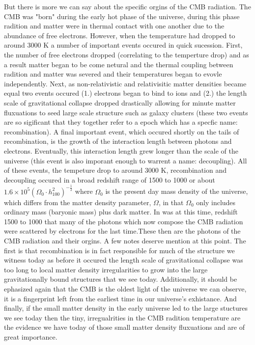 \documentclass[12pt]{article} %
\begin{document}
But there is more we can say about the specific orgins of the CMB radiation. The CMB was "born" during the early hot phase of the universe, during this phase radition and matter were in thermal contact with one another due to the abundance of free electrons. However, when the temperature had dropped to around 3000 K a number of important events occured in quick sucession. First, the number of free electrons dropped (correlating to the temperture drop) and as a result matter began to be come netural and the thermal coupling between radition and matter was severed and their temperatures began to evovle independently. Next, as non-relativistic and relativisitic matter densities became equal two events occured (1.) electrons began to bind to ions and (2.) the length scale of gravitational collapse dropped drastically allowing for minute matter fluxuations to seed large scale structure such as galaxy clusters (these two events are so sigificant that they together refer to a epoch which has a specfic name: recombination). A final important event, which occured shortly on the tails of recombination, is the growth of the interaction length between photons and electrons. Eventually, this interaction length grew longer than the scale of the universe (this event is also imporant enough to warrent a name: decoupling). All of these events, the tempeture drop to around 3000 K, recombination and decoupling occured in a broad redshift range of 1500 to 1000 or about $1.6 \times 10^{5} (\Omega_0 \cdot h^{2}_{100})^{-\frac{1}{2}}$ where $\Omega_0$ is the present day mass density of the universe, which differs from the matter density parameter, $\Omega$, in that $\Omega_0$ only includes ordinary mass (baryonic mass) plus dark matter. In was at this time, redshift 1500 to 1000 that many of the photons which now compose the CMB radiation were scattered by electrons for the last time.These then are the photons of the CMB radiation and their orgins. A few notes deserve mention at this point. The first is that recombination is in fact responsible for much of the structure we witness today as before it occured the length scale of gravitational collapse was too long to local matter density irregularities to grow into the large gravitationally bound structures that we see today. Additionally, it should be ephasized again that the CMB is the oldest light of the universe we can observe, it is a fingerprint left from the earliest time in our universe's exhistance. And finally, if the small matter density in the early universe led to the large stuctures we see today then the tiny, irregualrities in the CMB radition temperature are the evidence we have today of those small matter density fluxuations and are of great importance. 
\end{document}

